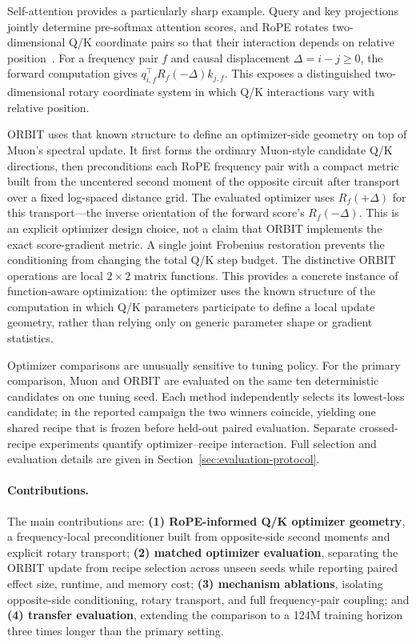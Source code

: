 \documentclass[10pt]{article}
\begin{document}
Self-attention provides a particularly sharp example. Query and key projections jointly
determine pre-softmax attention scores, and RoPE rotates two-dimensional Q/K coordinate
pairs so that their interaction depends on relative position~\cite{su2021roformer}. For a
frequency pair $f$ and causal displacement $\Delta=i-j\ge0$, the forward computation gives
$q_{i,f}^{\top}R_f(-\Delta)k_{j,f}$. This exposes a distinguished two-dimensional rotary
coordinate system in which Q/K interactions vary with relative position.

ORBIT uses that known structure to define an optimizer-side geometry on top of Muon's
spectral update. It first forms the ordinary Muon-style candidate Q/K directions, then
preconditions each RoPE frequency pair with a compact metric built from the uncentered
second moment of the opposite circuit after transport over a fixed log-spaced distance
grid. The evaluated optimizer uses $R_f(+\Delta)$ for this transport---the inverse
orientation of the forward score's $R_f(-\Delta)$. This is an explicit optimizer design
choice, not a claim that ORBIT implements the exact score-gradient metric. A single joint
Frobenius restoration prevents the conditioning from changing the total Q/K step budget.
The distinctive ORBIT operations are local $2\times2$ matrix functions. This provides a
concrete instance of function-aware optimization: the optimizer uses the known structure of
the computation in which Q/K parameters participate to define a local update geometry,
rather than relying only on generic parameter shape or gradient statistics.

Optimizer comparisons are unusually sensitive to tuning policy. For the primary comparison,
Muon and ORBIT are evaluated on the same ten deterministic candidates on one tuning seed.
Each method independently selects its lowest-loss candidate; in the reported campaign the
two winners coincide, yielding one shared recipe that is frozen before held-out paired
evaluation. Separate crossed-recipe experiments quantify optimizer--recipe interaction.
Full selection and evaluation details are given in Section~\ref{sec:evaluation-protocol}.

\paragraph{Contributions.}
The main contributions are:
\textbf{(1) RoPE-informed Q/K optimizer geometry}, a frequency-local preconditioner built
from opposite-side second moments and explicit rotary transport;
\textbf{(2) matched optimizer evaluation}, separating the ORBIT update from recipe
selection across unseen seeds while reporting paired effect size, runtime, and memory cost;
\textbf{(3) mechanism ablations}, isolating opposite-side conditioning, rotary transport,
and full frequency-pair coupling; and
\textbf{(4) transfer evaluation}, extending the comparison to a 124M training horizon three
times longer than the primary setting.
\end{document}
